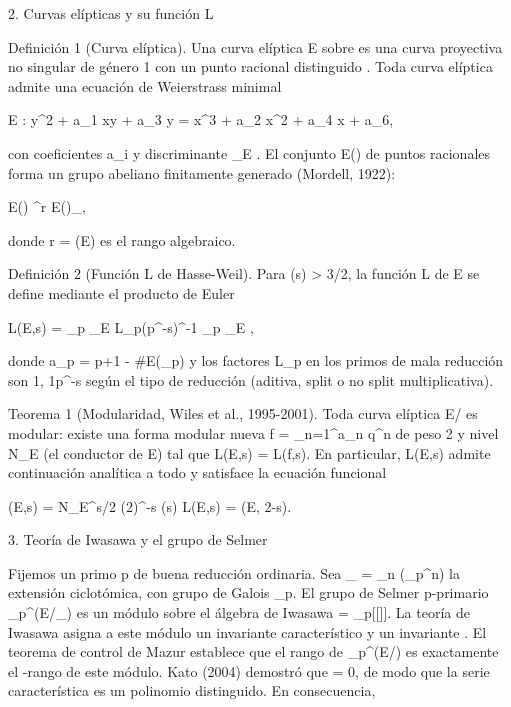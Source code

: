 \documentclass[12pt,a4paper]{book}
\begin{document}
2. Curvas elípticas y su función L

Definición 1 (Curva elíptica). Una curva elíptica E sobre  es una curva proyectiva no singular de género 1 con un punto racional distinguido . Toda curva elíptica admite una ecuación de Weierstrass minimal

E : y^2 + a_1 xy + a_3 y = x^3 + a_2 x^2 + a_4 x + a_6,

con coeficientes a_i \in {} y discriminante \Delta_E . El conjunto E() de puntos racionales forma un grupo abeliano finitamente generado (Mordell, 1922):

E() \cong {}^r \times E()_{},

donde r = (E) es el rango algebraico.

Definición 2 (Función L de Hasse-Weil). Para \Re(s) > 3/2, la función L de E se define mediante el producto de Euler

L(E,s) = \prod_{p \mid \Delta_E} L_p(p^{-s})^{-1} \prod_{p \nmid \Delta_E} ,

donde a_p = p+1 - \#E(_p) y los factores L_p en los primos de mala reducción son 1, 1\pm p^{-s} según el tipo de reducción (aditiva, split o no split multiplicativa).

Teorema 1 (Modularidad, Wiles et al., 1995-2001). Toda curva elíptica E/ es modular: existe una forma modular nueva f = \sum_{n=1}^\infty a_n q^n de peso 2 y nivel N_E (el conductor de E) tal que L(E,s) = L(f,s). En particular, L(E,s) admite continuación analítica a todo  y satisface la ecuación funcional

\Lambda(E,s) = N_E^{s/2} (2\pi)^{-s} \Gamma(s) L(E,s) = \pm \Lambda(E, 2-s).

3. Teoría de Iwasawa y el grupo de Selmer

Fijemos un primo p de buena reducción ordinaria. Sea _{\infty} = \bigcup_{n} (\mu_{p^n}) la extensión ciclotómica, con grupo de Galois \Gamma \cong {}_p. El grupo de Selmer p-primario _{p^\infty}(E/_{\infty}) es un módulo sobre el álgebra de Iwasawa \Lambda = _p[[\Gamma]]. La teoría de Iwasawa asigna a este módulo un invariante característico \lambda y un invariante \mu. El teorema de control de Mazur establece que el rango de _{p^\infty}(E/) es exactamente el \Lambda-rango de este módulo. Kato (2004) demostró que \mu = 0, de modo que la serie característica es un polinomio distinguido. En consecuencia,
\end{document}
